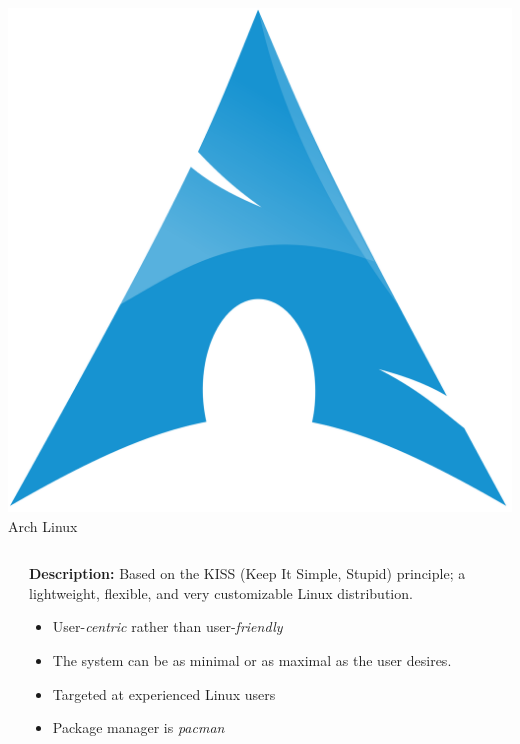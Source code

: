 \documentclass[11pt]{beamer}
\begin{document}
\begin{frame}{\includegraphics[scale=0.007]{arch-logo.png} Arch Linux}
\begin{columns}
\begin{column}{0.35\textwidth}
\begin{itemize}
			\end{itemize}
		\end{column}
		\begin{column}{0.65\textwidth}
			\small
			\textbf{Description:} Based on the KISS (Keep It Simple, Stupid) principle; a lightweight, flexible, and very customizable Linux distribution.
			\begin{itemize}
				\item User-\textit{centric} rather than user-\textit{friendly}
				\item The system can be as minimal or as maximal as the user desires.
				\item Targeted at experienced Linux users
				\item Package manager is \textit{pacman}
			\end{itemize}
		\end{column}
	\end{columns}
\end{frame}
\end{document}
